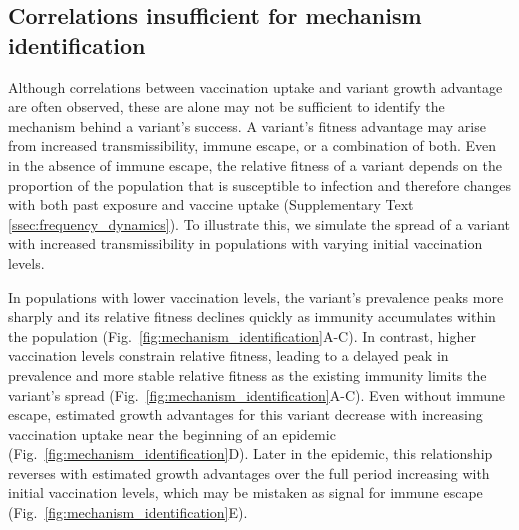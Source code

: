 \documentclass[11pt,oneside,letterpaper]{article}
\begin{document}
\subsection*{Correlations insufficient for mechanism identification}

Although correlations between vaccination uptake and variant growth advantage are often observed, these are alone may not be sufficient to identify the mechanism behind a variant's success.
A variant’s fitness advantage may arise from increased transmissibility, immune escape, or a combination of both.
Even in the absence of immune escape, the relative fitness of a variant depends on the proportion of the population that is susceptible to infection and therefore changes with both past exposure and vaccine uptake (Supplementary Text \ref{ssec:frequency_dynamics}).
To illustrate this, we simulate the spread of a variant with increased transmissibility in populations with varying initial vaccination levels.

In populations with lower vaccination levels, the variant’s prevalence peaks more sharply and its relative fitness declines quickly as immunity accumulates within the population (Fig.~\ref{fig:mechanism_identification}A-C).
In contrast, higher vaccination levels constrain relative fitness, leading to a delayed peak in prevalence and more stable relative fitness as the existing immunity limits the variant’s spread (Fig.~\ref{fig:mechanism_identification}A-C).
Even without immune escape, estimated growth advantages for this variant decrease with increasing vaccination uptake near the beginning of an epidemic (Fig.~\ref{fig:mechanism_identification}D).
Later in the epidemic, this relationship reverses with estimated growth advantages over the full period increasing with initial vaccination levels, which may be mistaken as signal for immune escape (Fig.~\ref{fig:mechanism_identification}E).
\end{document}
